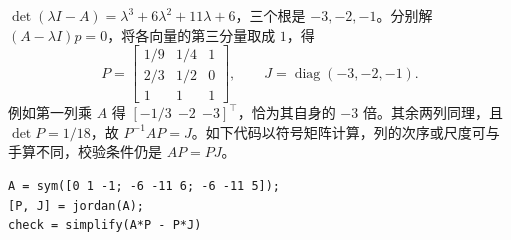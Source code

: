 

\sol $\det(\lambda I-A)=\lambda^3+6\lambda^2+11\lambda+6$，三个根是 $-3,-2,-1$。分别解 $(A-\lambda I)p=0$，将各向量的第三分量取成 $1$，得
\[
    P=\begin{bmatrix}1/9&1/4&1\\2/3&1/2&0\\1&1&1\end{bmatrix},\qquad
    J=\operatorname{diag}(-3,-2,-1).
\]
例如第一列乘 $A$ 得 $[-1/3\ \ {-2}\ \ {-3}]^\top$，恰为其自身的 $-3$ 倍。其余两列同理，且 $\det P=1/18$，故 $P^{-1}AP=J$。如下代码以符号矩阵计算，列的次序或尺度可与手算不同，校验条件仍是 $AP=PJ$。
\begin{verbatim}
A = sym([0 1 -1; -6 -11 6; -6 -11 5]);
[P, J] = jordan(A);
check = simplify(A*P - P*J)
\end{verbatim}
